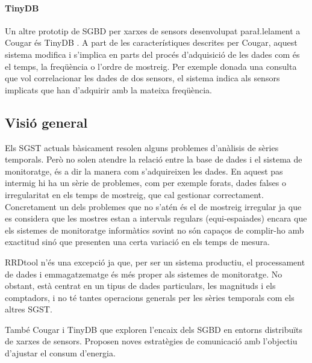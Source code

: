 \paragraph{TinyDB} Un altre prototip de SGBD per xarxes de sensors desenvolupat para\l.lelament a Cougar és TinyDB \parencite{tinyDB}. A part de les característiques descrites per Cougar, aquest sistema  modifica i s'implica en parts del procés d'adquisició de les dades com és el temps, la freqüència o l'ordre de mostreig. Per exemple donada una consulta que vol correlacionar les dades de dos sensors, el sistema indica als sensors implicats que han d'adquirir amb la mateixa freqüència.





\subsection{Visió general}

Els SGST actuals bàsicament resolen alguns problemes d'anàlisis de sèries temporals.
Però no solen atendre la relació entre la base de dades i el sistema de monitoratge, és a dir la manera com s'adquireixen les dades. En aquest pas intermig hi ha un sèrie de problemes, com per exemple forats, dades falses o irregularitat en els temps de mostreig, que cal gestionar correctament. Concretament un dels problemes que no s'atén és el de mostreig irregular ja que es considera que les mostres estan a intervals regulars (equi-espaiades) encara que els sistemes de monitoratge informàtics sovint no són capaços de complir-ho amb exactitud sinó que presenten una certa variació en els temps de mesura. 

RRDtool n'és una excepció ja que, per ser un sistema productiu, el processament de dades i emmagatzematge és més proper als sistemes de monitoratge. No obstant, està centrat en un tipus de dades particulars, les magnituds i els comptadors, i no té tantes operacions generals per les sèries temporals com els altres SGST.

També Cougar i TinyDB que exploren l'encaix dels SGBD en entorns distribuïts de xarxes de sensors. Proposen noves estratègies de comunicació amb l'objectiu d'ajustar el consum d'energia. 





